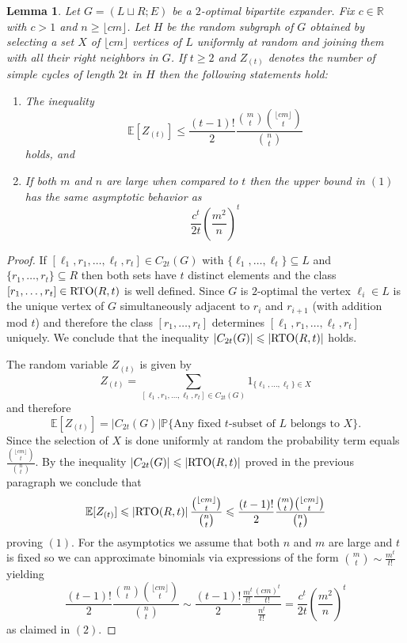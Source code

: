 \documentclass[12pt]{amsart}
\newtheorem{lemma}{Lemma}[section]
\theoremstyle{definition}
\renewcommand{\geq}{\geqslant}
\renewcommand{\leq}{\leqslant}
\newcommand{\PP}{\ensuremath{\mathbb{P}}}
\newcommand{\RR}{\ensuremath{\mathbb{R}}}
\newcommand{\EE}{\ensuremath{\mathbb{E}}}
\newcommand{\1}{\ensuremath{\mathbb{1}}}
\begin{document}
\begin{lemma}\label{lem: expectedcycles} Let $G=(L\sqcup R ; E)$ be a $2$-optimal bipartite expander. Fix $c\in \RR$ with $c>1$ and $n\geq \lfloor cm\rfloor$. Let $H$ be the random subgraph of $G$ obtained by selecting a set $X$ of $\lfloor cm\rfloor$ vertices of $L$ uniformly at random and joining them with all their right neighbors in $G$. If $t\geq 2$ and $Z_{(t)}$ denotes the number of simple cycles of length $2t$ in $H$ then the following statements hold:
\begin{enumerate}
\item The inequality
\[\EE[Z_{(t)}]\leq \frac{(t-1)!}{2}\frac{\binom{m}{t}\binom{\lfloor cm\rfloor}{t}}{\binom{n}{t}}\]
holds, and
\item If both $m$ and $n$ are large when compared to $t$ then the upper bound in $(1)$ has the same asymptotic behavior as 
\[\frac{c^t}{2t}\left(\frac{m^2}{n}\right)^t\]
\end{enumerate}
\end{lemma}
\begin{proof} If $[\ell_1,r_1,\dots, \ell_t,r_t]\in C_{2t}(G)$ with $\{\ell_1,\dots,\ell_t\}\subseteq L$ and $\{r_1,\dots, r_t\}\subseteq R$ then both sets have $t$ distinct elements and the class $[r_1,\dots, r_t]\in {\rm RTO}(R,t)$ is well defined. Since $G$ is $2$-optimal the vertex $\ell_i\in L$ is the unique vertex of $G$ simultaneously adjacent to $r_i$ and $r_{i+1}$ (with addition mod $t$) and therefore the class $[r_1,\dots, r_t]$ determines $[\ell_1,r_1,\dots, \ell_t,r_t]$ uniquely. We conclude that the inequality $\left|C_{2t}(G)\right|\leq \left|{\rm RTO}(R,t)\right|$ holds.
 
The random variable $Z_{(t)}$ is given by
\[Z_{(t)}=\sum_{[\ell_1,r_1,\dots, \ell_t,r_t]\in C_{2t}(G)}1_{\{\ell_1,\dots,\ell_t\}\in X} \]
and therefore 
\[\EE[Z_{(t)}]=|C_{2t}(G)|\PP\{\text{Any fixed $t$-subset of $L$ belongs to $X$}\}.\]
Since the selection of $X$ is done uniformly at random the probability term equals $\frac{\binom{\lfloor cm\rfloor}{t}}{\binom{n}{t}}$. By the inequality $\left|C_{2t}(G)\right|\leq \left|{\rm RTO}(R,t)\right|$ proved in the previous paragraph we conclude that
\[\EE[Z_{(t)}]\leq \left|{\rm RTO}(R,t)\right|\frac{\binom{\lfloor cm\rfloor}{t}}{\binom{n}{t}}\leq \frac{(t-1)!}{2}\frac{\binom{m}{t}\binom{\lfloor cm\rfloor}{t}}{\binom{n}{t}}\]
proving $(1)$. For the asymptotics we assume that both $n$ and $m$ are large and $t$ is fixed so we can approximate binomials via expressions of the form $\binom{m}{t}\sim \frac{m^t}{t!}$ yielding
\[\frac{(t-1)!}{2}\frac{\binom{m}{t}\binom{\lfloor cm\rfloor}{t}}{\binom{n}{t}}\sim \frac{(t-1)!}{2} \frac{\frac{m^t}{t!}\frac{(cm)^t}{t!}}{\frac{n^t}{t!}}=\frac{c^t}{2t}\left(\frac{m^2}{n}\right)^t\]
as claimed in $(2)$.
\end{proof}
\end{document}
